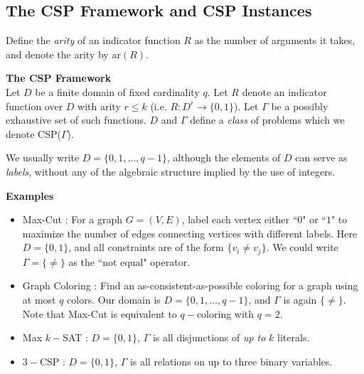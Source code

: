 \subsection{The CSP Framework and CSP Instances}
Define the \textit{arity} of an indicator function $R$ as the number of arguments it takes, and denote the arity by $\text{ar}(R)$.

\begin{definition}
\textbf{The CSP Framework} \\
Let $D$ be a finite domain of fixed cardinality $q$. 
Let $R$ denote an indicator function over $D$ with arity $r \leq k$ (i.e. $R:D^r \to \{0,1\}$). 
Let $\Gamma$ be a possibly exhaustive set of such functions. 
$D$ and $\Gamma$ define a \textit{class} of problems which we denote CSP($\Gamma$).
\label{def:CSPframework}
\end{definition}

We usually write $D = \{0,1,\ldots,q-1\}$, although the elements of $D$ can serve as \textit{labels}, without any of the algebraic structure implied by the use of integers.

\textbf{Examples}
\begin{itemize}
\item Max-Cut : For a graph $G = (V,E)$, label each vertex either ``$0$" or ``$1$" to maximize the number of edges connecting vertices with different labels.   
Here $D = \{0,1\}$, and all constraints are of the form $\{v_i \neq v_j\}$. We could write $\Gamma = \{\neq\}$ as the ``not equal" operator. 
\item Graph Coloring : Find an as-consistent-as-possible coloring for a graph using at most $q$ colors. 
Our domain is $D = \{0,1,\ldots,q-1\}$, and $\Gamma$ is again $\{\neq\}$. 
Note that Max-Cut is equivalent to $q-$coloring with $q = 2$.
\item Max $k-$SAT : $D = \{0,1\}$, $\Gamma$ is all disjunctions of \textit{up to} $k$ literals.
\item $3-$CSP : $D = \{0,1\}$, $\Gamma$ is all relations on up to three binary variables.
\end{itemize}


